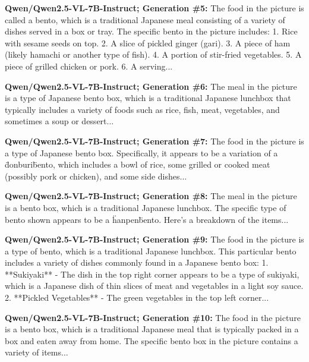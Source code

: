 \documentclass{article} %
\begin{document}
\begin{tcolorbox}[
    colback=white,
    colframe=lightblue,
    arc=10pt,
    boxrule=3pt,
    left=10pt,
    right=10pt,
    top=10pt,
    bottom=10pt
]
\noindent\faRobot \hspace{5pt} \textbf{Qwen/Qwen2.5-VL-7B-Instruct; Generation \#5:}
The food in the picture is called a bento, which is a traditional Japanese meal consisting of a variety of dishes served in a box or tray. The specific bento in the picture includes: 1. Rice with sesame seeds on top. 2. A slice of pickled ginger (gari). 3. A piece of ham (likely hamachi or another type of fish). 4. A portion of stir-fried vegetables. 5. A piece of grilled chicken or pork. 6. A serving...

\vspace{8pt}
\noindent\faRobot \hspace{5pt} \textbf{Qwen/Qwen2.5-VL-7B-Instruct; Generation \#6:}
The meal in the picture is a type of Japanese bento box, which is a traditional Japanese lunchbox that typically includes a variety of foods such as rice, fish, meat, vegetables, and sometimes a soup or dessert...

\vspace{8pt}
\noindent\faRobot \hspace{5pt} \textbf{Qwen/Qwen2.5-VL-7B-Instruct; Generation \#7:}
The food in the picture is a type of Japanese bento box. Specifically, it appears to be a variation of a \"donburi\" bento, which includes a bowl of rice, some grilled or cooked meat (possibly pork or chicken), and some side dishes...

\vspace{8pt}
\noindent\faRobot \hspace{5pt} \textbf{Qwen/Qwen2.5-VL-7B-Instruct; Generation \#8:}
The meal in the picture is a bento box, which is a traditional Japanese lunchbox. The specific type of bento shown appears to be a \"hanpen\" bento. Here's a breakdown of the items...

\vspace{8pt}
\noindent\faRobot \hspace{5pt} \textbf{Qwen/Qwen2.5-VL-7B-Instruct; Generation \#9:}
The food in the picture is a type of bento, which is a traditional Japanese lunchbox. This particular bento includes a variety of dishes commonly found in a Japanese bento box: 1. **Sukiyaki** - The dish in the top right corner appears to be a type of sukiyaki, which is a Japanese dish of thin slices of meat and vegetables in a light soy sauce. 2. **Pickled Vegetables** - The green vegetables in the top left corner...

\vspace{8pt}
\noindent\faRobot \hspace{5pt} \textbf{Qwen/Qwen2.5-VL-7B-Instruct; Generation \#10:}
The food in the picture is a bento box, which is a traditional Japanese meal that is typically packed in a box and eaten away from home. The specific bento box in the picture contains a variety of items...

\end{tcolorbox}
\end{document}
